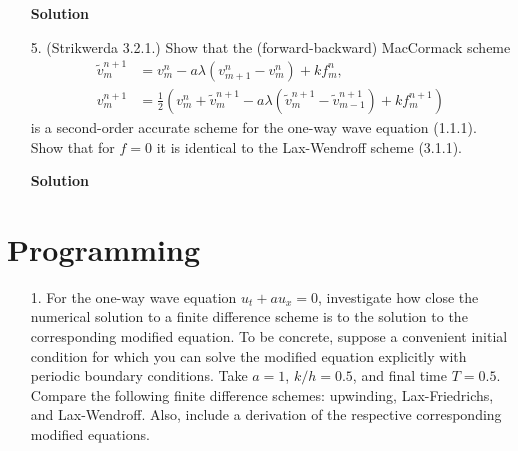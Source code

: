 \documentclass{article}
\begin{document}
\begin{itemize}
\textbf{Solution}

\item[5.] (Strikwerda 3.2.1.) Show that the (forward-backward) MacCormack scheme
\begin{align*}
\tilde{v}^{n+1}_m & = v^n_m - a \lambda \left( v^n_{m+1} - v^n_m \right) + k f^n_m, \\
v^{n+1}_m & = \frac{1}{2} \left( v^n_m + \tilde{v}^{n+1}_m - a \lambda \left( \tilde{v}^{n+1}_m - \tilde{v}^{n+1}_{m-1} \right) + k f^{n+1}_m \right)
\end{align*}
is a second-order accurate scheme for the one-way wave equation (1.1.1). Show that for $f = 0$ it is identical to the Lax-Wendroff scheme (3.1.1).

\textbf{Solution}

\end{itemize}

\section{Programming}

\begin{itemize}

\item[1.] For the one-way wave equation $u_t + a u_x = 0$, investigate how close the numerical solution to a finite difference scheme is to the solution to the corresponding modified equation. To be concrete, suppose a convenient initial condition for which you can solve the modified equation explicitly with periodic boundary conditions. Take $a = 1$, $k/h = 0.5$, and final time $T = 0.5$. Compare the following finite difference schemes: upwinding, Lax-Friedrichs, and Lax-Wendroff. Also, include a derivation of the respective corresponding modified equations.

\end{itemize}
\end{document}
